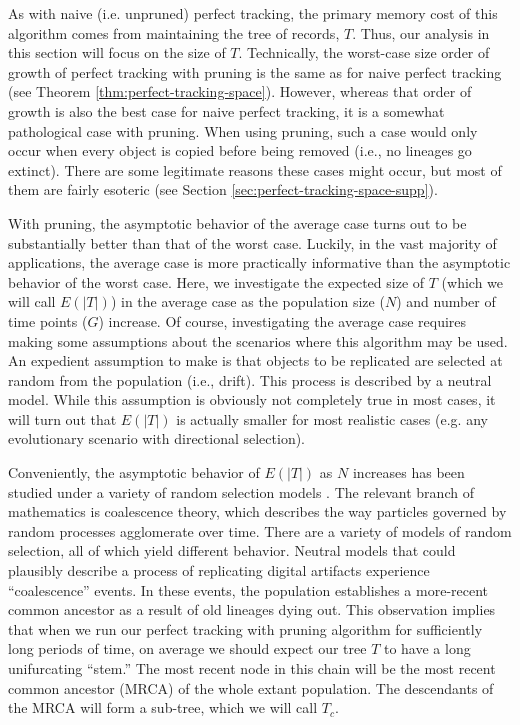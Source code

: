 As with naive (i.e. unpruned) perfect tracking, the primary memory cost of this algorithm comes from maintaining the tree of records, $T$.
Thus, our analysis in this section will focus on the size of $T$.
Technically, the worst-case size order of growth of perfect tracking with pruning is the same as for naive perfect tracking (see Theorem \ref{thm:perfect-tracking-space}).
However, whereas that order of growth is also the best case for naive perfect tracking, it is a somewhat pathological case with pruning.
When using pruning, such a case would only occur when every object is copied before being removed (i.e., no lineages go extinct).
There are some legitimate reasons these cases might occur, but most of them are fairly esoteric (see Section \ref{sec:perfect-tracking-space-supp}).


With pruning, the asymptotic behavior of the average case turns out to be substantially better than that of the worst case.
Luckily, in the vast majority of applications, the average case is more practically informative than the asymptotic behavior of the worst case.
Here, we investigate the expected size of $T$ (which we will call $E(|T|)$) in the average case as the population size ($N$) and number of time points ($G$) increase.
Of course, investigating the average case requires making some assumptions about the scenarios where this algorithm may be used.
An expedient assumption to make is that objects to be replicated are selected at random from the population (i.e., drift).
This process is described by a neutral model.
While this assumption is obviously not completely true in most cases, it will turn out that $E(|T|)$ is actually smaller for most realistic cases (e.g. any evolutionary scenario with directional selection).

Conveniently, the asymptotic behavior of $E(|T|)$ as $N$ increases has been studied under a variety of random selection models \citep{berestyckiRecentProgressCoalescent2009, tellierCoalescenceMultipleBranching2014, nordborgCoalescentTheory2019}.
The relevant branch of mathematics is coalescence theory, which describes the way particles governed by random processes agglomerate over time.
There are a variety of models of random selection, all of which yield different behavior.
Neutral models that could plausibly describe a process of replicating digital artifacts experience ``coalescence'' events.
In these events, the population establishes a more-recent common ancestor as a result of old lineages dying out.
This observation implies that when we run our perfect tracking with pruning algorithm for sufficiently long periods of time, on average we should expect our tree $T$ to have a long unifurcating ``stem.''
The most recent node in this chain will be the most recent common ancestor (MRCA) of the whole extant population.
The descendants of the MRCA will form a sub-tree, which we will call $T_c$.

